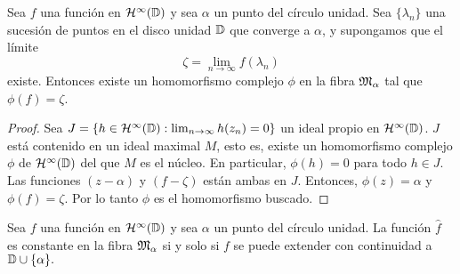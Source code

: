 \begin{theorem}
    \label{result1}
    Sea $f$ una función en $\mathcal{H}^{\infty}(\mathbb{D})$ y sea $\alpha$ un punto del círculo unidad. Sea $\{\lambda_n\}$ una sucesión de puntos en el disco unidad $\mathbb{D}$ que converge a $\alpha$, y supongamos que el límite
    \begin{equation*}
        \zeta = \lim_{n \rightarrow \infty} f(\lambda_n)
    \end{equation*}
    existe. Entonces existe un homomorfismo complejo $\phi$ en la fibra $\mathfrak{M}_\alpha$ tal que $\phi(f) = \zeta$.
\end{theorem}

\begin{proof}
    Sea $J = \{h\in \mathcal{H}^{\infty}(\mathbb{D}) : \lim_{n \rightarrow \infty} h(z_n) = 0 \}$ un ideal propio en $\mathcal{H}^{\infty}(\mathbb{D})$. $J$ está contenido en un ideal maximal $M$, esto es, existe un homomorfismo complejo $\phi$ de  $\mathcal{H}^{\infty}(\mathbb{D})$ del que $M$ es el núcleo. En particular, $\phi(h) = 0$ para todo $h \in J$. Las funciones $(z - \alpha)$ y $(f - \zeta)$ están ambas en $J$.
        Entonces, $\phi(z) = \alpha$ y $\phi(f) = \zeta$. Por lo tanto $\phi$ es el homomorfismo buscado. %
\end{proof}

\begin{theorem}
    Sea $f$ una función en $\mathcal{H}^{\infty}(\mathbb{D})$ y sea $\alpha$ un punto del círculo unidad. La función $\hat f$ es constante en la fibra $\mathfrak{M}_\alpha$ si y solo si $f$ se puede extender con continuidad a $\mathbb{D} \cup \{\alpha\}.$
\end{theorem}

